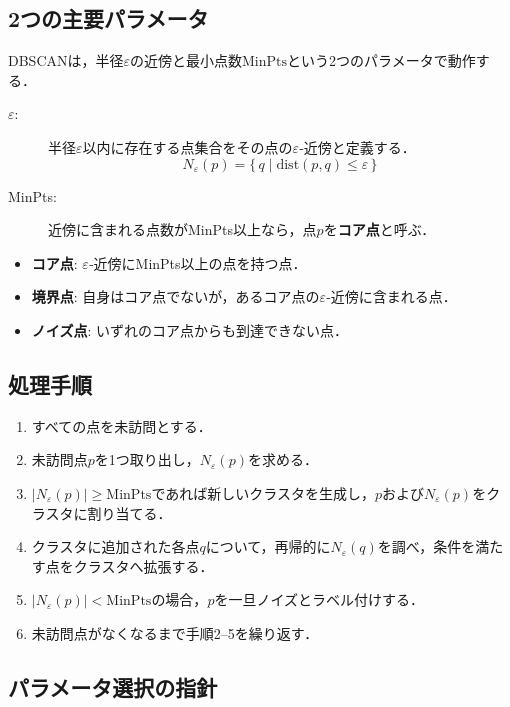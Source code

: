 \documentclass[a4j]{jsarticle}
\begin{document}
\subsection{2つの主要パラメータ}

DBSCANは，半径$\varepsilon$の近傍と最小点数$\text{MinPts}$という2つのパラメータで動作する．

\begin{description}
  \item[$\varepsilon$:] 半径$\varepsilon$以内に存在する点集合をその点の$\varepsilon$‐近傍と定義する．
        \[
          N_{\varepsilon}(p)=\{\,q \mid \mathrm{dist}(p,q)\le \varepsilon\,\}
        \]
  \item[MinPts:] 近傍に含まれる点数がMinPts以上なら，点$p$を\textbf{コア点}と呼ぶ．
\end{description}

\begin{itemize}
  \item \textbf{コア点}: $\varepsilon$‐近傍にMinPts以上の点を持つ点．
  \item \textbf{境界点}: 自身はコア点でないが，あるコア点の$\varepsilon$‐近傍に含まれる点．
  \item \textbf{ノイズ点}: いずれのコア点からも到達できない点．
\end{itemize}

\subsection{処理手順}
\begin{enumerate}
  \item すべての点を未訪問とする．
  \item 未訪問点$p$を1つ取り出し，$N_{\varepsilon}(p)$を求める．
  \item $|N_{\varepsilon}(p)|\ge\text{MinPts}$であれば新しいクラスタを生成し，$p$および$N_{\varepsilon}(p)$をクラスタに割り当てる．
  \item クラスタに追加された各点$q$について，再帰的に$N_{\varepsilon}(q)$を調べ，条件を満たす点をクラスタへ拡張する．
  \item $|N_{\varepsilon}(p)|<\text{MinPts}$の場合，$p$を一旦ノイズとラベル付けする．
  \item 未訪問点がなくなるまで手順2–5を繰り返す．
\end{enumerate}

\subsection{パラメータ選択の指針}
\end{document}
